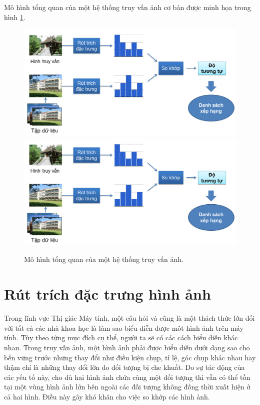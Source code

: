 Mô hình tổng quan của một hệ thống truy vấn ảnh cơ bản được minh họa trong hình \ref{FigOverall}.

\begin{figure}[!htbp]
  \begin{center}
    \leavevmode
    \ifpdf
      \includegraphics[scale=0.34]{overall}
    \else
      \includegraphics[scale=0.34]{overall}
    \fi
    \caption[Mô hình tổng quan của một hệ thống truy vấn ảnh]{Mô hình tổng quan của một hệ thống truy vấn ảnh.}
    \label{FigOverall}
  \end{center}
\end{figure}

\section{Rút trích đặc trưng hình ảnh}
\label{feature-extraction}
Trong lĩnh vực Thị giác Máy tính, một câu hỏi và cũng là một thách thức lớn đối với tất cả các nhà khoa học là làm sao biểu diễn được môt hình ảnh trên máy tính. Tùy theo từng mục đích cụ thể, người ta sẽ có các cách biểu diễn khác nhau. Trong truy vấn ảnh, một hình ảnh phải được biểu diễn dưới dạng sao cho bền vững trước những thay đổi như điều kiện chụp, tỉ lệ, góc chụp khác nhau hay thậm chí là những thay đổi lớn do đối tượng bị che khuất. Do sự tác động của các yếu tố này, cho dù hai hình ảnh chứa cùng một đối tượng thì vẫn có thể tồn tại một vùng hình ảnh lớn bên ngoài các đối tượng không đồng thời xuất hiện ở cả hai hình. Điều này gây khó khăn cho việc so khớp các hình ảnh.

